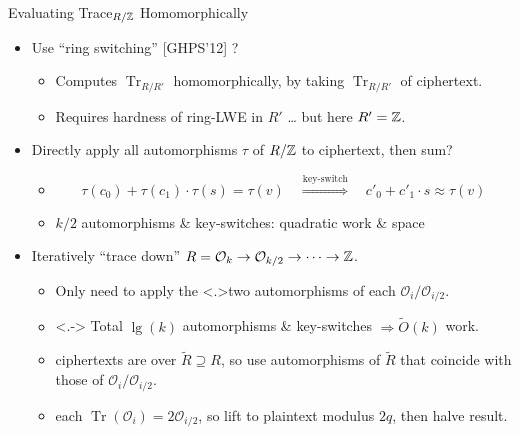 \documentclass[shadow,xcolor=pdftex,svgnames,table,t]{beamer}
\DeclareMathOperator{\trace}{Tr}
\renewcommand{\O}{\mathcal{O}}
\begin{document}
\begin{frame}[label=trace]{Evaluating Trace$_{R/\mathbb{Z}}$ Homomorphically}
  \begin{itemize}
  \item<+->[??] Use ``ring switching'' {\footnotesize [GHPS'12]} ?

    \begin{itemize}
    \item[\GreenCheck] Computes $\trace_{R/R'}$ homomorphically, by
      taking $\trace_{R/R'}$ of ciphertext.

      \smallskip
    \item<+->[\RedCross] Requires hardness of ring-LWE in $R'$ \ldots
      but here $R' = \mathbb{Z}$.
    \end{itemize}

    \medskip
  \item<+->[??] Directly apply all automorphisms $\tau$ of $R/\mathbb{Z}$
    to ciphertext, then sum?
    \begin{itemize}
      \item[] \vspace{-6pt}
        \[ \tau(c_{0}) + \tau(c_{1}) \cdot \tau(s) = \tau(v)
        \quad \stackrel{\text{key-switch}}{\Longrightarrow} \quad
        c'_{0} + c'_{1} \cdot s \approx \tau(v) \]
      \item<+->[\RedCross] $k/2$ automorphisms \& key-switches:
        quadratic work \& space
    \end{itemize}
    
    \medskip
  \item<+->[\GreenCheck] Iteratively ``trace down'' $R=\O_{k} \to
    \O_{k/2} \to \cdots \to \Z$.
    
    \begin{itemize}
    \item<+-> Only need to apply the \alert<.>{two} automorphisms of
      each $\O_{i}/\O_{i/2}$.

    \item<.-> Total $\lg(k)$ automorphisms \& key-switches
      $\Rightarrow \tilde{O}(k)$ work.

      \medskip
    \item<+->[Detail \#1:] ciphertexts are over $\tilde{R} \supseteq
      R$, so use automorphisms of $\tilde{R}$ that coincide with those
      of $\O_{i}/\O_{i/2}$.

      \medskip
    \item<+->[Detail \#2:] each $\trace(\O_{i}) = 2\O_{i/2}$, so lift
      to plaintext modulus $2q$, then halve result.
    \end{itemize}
  \end{itemize}
\end{frame}
\end{document}
